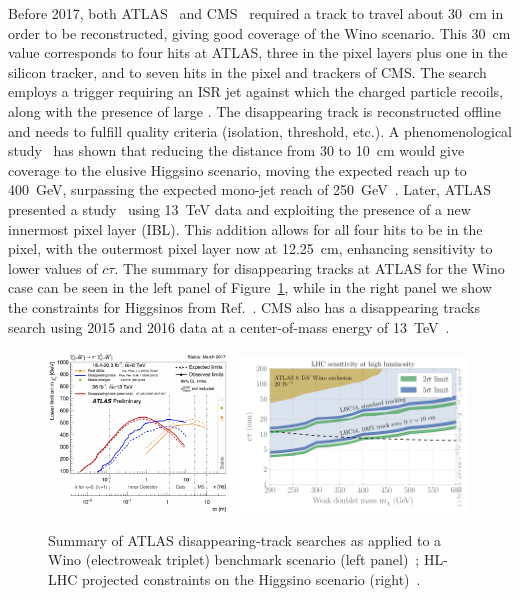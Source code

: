 Before 2017, both ATLAS~\cite{Aad:2013yna} and CMS~\cite{CMS:2014gxa} required a track to travel about 30~cm in order to be reconstructed, giving good coverage of the Wino scenario. This 30~cm value corresponds to four hits at ATLAS, three in the pixel layers plus one in the silicon tracker, and to seven hits in the pixel and trackers of CMS. The search employs a trigger requiring an ISR jet against which the charged particle recoils, along with the presence of large \met. The disappearing track is reconstructed offline and needs to fulfill quality criteria (isolation, \pT threshold, etc.). A phenomenological study~\cite{Mahbubani:2017gjh} has shown that reducing the distance from 30 to 10~cm would give coverage to the elusive Higgsino scenario, moving the expected reach up to 400~GeV, surpassing the expected mono-jet reach of 250~GeV~\cite{Schwaller:2013baa,Low:2014cba,Barducci:2015ffa}. Later, ATLAS presented a study~\cite{ATLAS-CONF-2017-017} using 13~TeV data and exploiting the presence of a new innermost pixel layer (IBL). This addition allows for all four hits to be in the pixel, with the outermost pixel layer now at 12.25~cm, enhancing sensitivity to lower values of $c \tau$. The summary for disappearing tracks at ATLAS for the Wino case can be seen in the left panel of Figure~\ref{fig:ewkinosearches}, while in the right panel we show the constraints for Higgsinos from Ref.~\cite{Mahbubani:2017gjh}. CMS also has a disappearing tracks search using 2015 and 2016 data at a center-of-mass energy of 13~TeV~\cite{Sirunyan:2018ldc}.

\begin{figure}[t]
\centering
\includegraphics[width=0.44\textwidth]{plots/ATLAS_SUSY_LLPChargino.pdf}
\includegraphics[width=0.54\textwidth]{plots/Higgsino_Significance14}
\caption{Summary of ATLAS disappearing-track searches as applied to a Wino (electroweak triplet) benchmark scenario (left panel)~\cite{ATLAS:summary}; HL-LHC projected constraints on the Higgsino scenario (right)~\cite{Mahbubani:2017gjh}.}
  \label{fig:ewkinosearches}
\end{figure}

